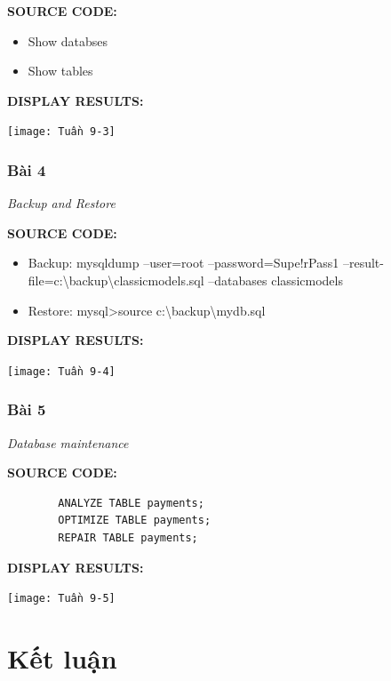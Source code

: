 \documentclass[12pt,a4paper]{report}
\begin{document}
	{\bf SOURCE CODE:}
	\begin{itemize}
		\item Show databses
		\item Show tables
	\end{itemize}
	
	{\bf DISPLAY RESULTS:}
	
	\begin{center}
		\texttt{[image: Tuần 9-3]}
	\end{center}

\subsection{Bài 4}
	\begin{center}
		{\it Backup and Restore}
	\end{center}
	
	{\bf SOURCE CODE:}
	\begin{itemize}
		\item Backup: mysqldump --user=root --password=Supe!rPass1 --result-file=c:\textbackslash backup\textbackslash classicmodels.sql --databases classicmodels
		\item Restore: mysql>source c:\textbackslash backup\textbackslash mydb.sql
	\end{itemize}

	{\bf DISPLAY RESULTS:}
	
		\texttt{[image: Tuần 9-4]}


\subsection{Bài 5}
	\begin{center}
		{\it Database maintenance}
	\end{center}

	{\bf SOURCE CODE:}
	\begin{lstlisting}
		ANALYZE TABLE payments;
		OPTIMIZE TABLE payments;
		REPAIR TABLE payments;
	\end{lstlisting}
	
	{\bf DISPLAY RESULTS:}
	
		\texttt{[image: Tuần 9-5]}




\chapter{Kết luận}                         %
\end{document}
